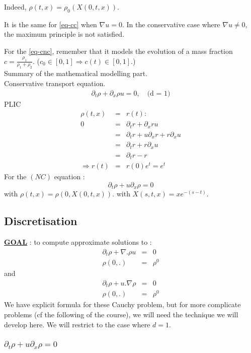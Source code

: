 \documentclass{report}
\theoremstyle{plain}
\theoremstyle{definition}
\theoremstyle{remark}
\begin{document}
Indeed, $\rho(t,x) = \rho_0(X(0,t,x))$.

It is the same for \eqref{eq-cc} when $\nabla u =0$.
In the conservative case where $\nabla u \neq 0$, the maximum principle 
is not satisfied.

For the \eqref{eq-cnc}, remember that it models the evolution of a mass fraction
$c=\frac{ \rho_1}{ \rho_1+\rho_2}$. ($c_0\in[0,1]\Rightarrow c(t)\in[0,1]$.)\\
Summary of the mathematical modelling part.\\
Conservative transport equation.
\begin{eqnarray}
\partial_t \rho + \partial_x \rho u = 0, \quad \text{(d = 1)}
\end{eqnarray}
PLIC
\begin{eqnarray*}
\rho(t,x) &=& r(t) :\\
0 &=& \partial_t r + \partial_x r u\\
&=& \partial_t r + u \partial_x r + r \partial_x u\\
&=& \partial_t r + r \partial_x u \\
&=& \partial_t r - r\\
\Rightarrow r(t) &=& r(0)e^t = e^t
\end{eqnarray*}
For the $(NC)$ equation : 
\begin{equation}
\partial_t \rho + u \partial_x \rho = 0
\end{equation}
with $\rho(t,x) = \rho\left(0,X(0,t,x)\right)$.
with $ X(s,t,x) = x e^{-(s-t)}$.
\subsection{Discretisation}
\textbf{\underline{GOAL}} : to compute approximate solutions to : 
\begin{eqnarray}
\partial_t \rho + \nabla.\rho u &=& 0\\
\rho(0,.) &=& \rho^0 
\end{eqnarray} 
and
\begin{eqnarray}
\partial_t \rho + u.\nabla \rho &=& 0\\
\rho(0,.) &=& \rho^0 
\end{eqnarray}
We have explicit formula for these Cauchy problem, but for more complicate problems (cf the following of the course), we will need the technique we will develop here.
We will restrict to the case where $d=1$.

\subsubsection{$\partial_t \rho + u \partial_x \rho = 0$}
\end{document}
